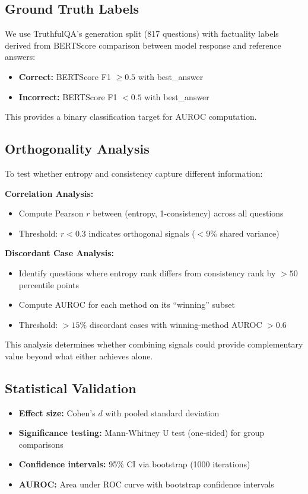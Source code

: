 \subsection{Ground Truth Labels}

We use TruthfulQA's generation split (817 questions) with factuality labels derived from BERTScore comparison between model response and reference answers:
\begin{itemize}
    \item \textbf{Correct:} BERTScore F1 $\geq 0.5$ with best\_answer
    \item \textbf{Incorrect:} BERTScore F1 $< 0.5$ with best\_answer
\end{itemize}

This provides a binary classification target for AUROC computation.

\subsection{Orthogonality Analysis}

To test whether entropy and consistency capture different information:

\textbf{Correlation Analysis:}
\begin{itemize}
    \item Compute Pearson $r$ between (entropy, 1-consistency) across all questions
    \item Threshold: $r < 0.3$ indicates orthogonal signals ($< 9\%$ shared variance)
\end{itemize}

\textbf{Discordant Case Analysis:}
\begin{itemize}
    \item Identify questions where entropy rank differs from consistency rank by $>50$ percentile points
    \item Compute AUROC for each method on its ``winning'' subset
    \item Threshold: $>15\%$ discordant cases with winning-method AUROC $>0.6$
\end{itemize}

This analysis determines whether combining signals could provide complementary value beyond what either achieves alone.

\subsection{Statistical Validation}

\begin{itemize}
    \item \textbf{Effect size:} Cohen's $d$ with pooled standard deviation
    \item \textbf{Significance testing:} Mann-Whitney U test (one-sided) for group comparisons
    \item \textbf{Confidence intervals:} 95\% CI via bootstrap (1000 iterations)
    \item \textbf{AUROC:} Area under ROC curve with bootstrap confidence intervals
\end{itemize}
